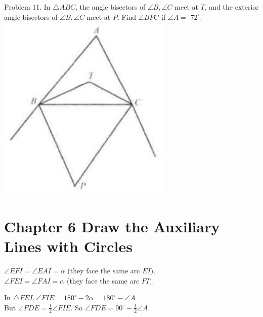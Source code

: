 \documentclass[10pt]{article}
\begin{document}
Problem 11. In \(\triangle A B C\), the angle bisectors of \(\angle B, \angle C\) meet at \(T\), and the exterior angle bisectors of \(\angle B, \angle C\) meet at \(P\). Find \(\angle B P C\) if \(\angle A=\) \(72^{\circ}\).\\
\includegraphics[max width=\textwidth, center]{2025_04_17_97bc1f7e44d93c271a88g-208(1)}

\section*{Chapter 6 Draw the Auxiliary Lines with Circles}
\(\angle E F I=\angle E A I=\alpha\) (they face the same arc \(E I)\).\\
\(\angle F E I=\angle F A I=\alpha\) (they face the same arc \(F I)\).

In \(\triangle F E I, \angle F I E=180^{\circ}-2 \alpha=180^{\circ}-\angle A\)\\
But \(\angle F D E=\frac{1}{2} \angle F I E\). So \(\angle F D E=90^{\circ}-\frac{1}{2} \angle A\).
\end{document}
